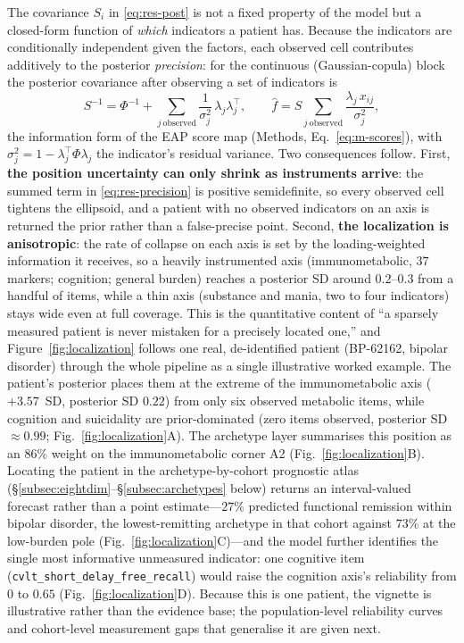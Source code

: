 The covariance $S_i$ in \eqref{eq:res-post} is not a fixed property of the model but a
closed-form function of \emph{which} indicators a patient has. Because the indicators are
conditionally independent given the factors, each observed cell contributes additively to the
posterior \emph{precision}: for the continuous (Gaussian-copula) block the posterior covariance
after observing a set of indicators is
\begin{equation}
  S^{-1}=\Phi^{-1}+\sum_{j\ \text{observed}}\frac{1}{\sigma_j^{2}}\,\lambda_j\lambda_j^{\top},
  \qquad
  \hat f=S\!\!\sum_{j\ \text{observed}}\frac{\lambda_j\,x_{ij}}{\sigma_j^{2}},
  \label{eq:res-precision}
\end{equation}
the information form of the EAP score map (Methods, Eq.~\ref{eq:m-scores}), with
$\sigma_j^{2}=1-\lambda_j^{\top}\Phi\lambda_j$ the indicator's residual variance. Two
consequences follow. First, \textbf{the position uncertainty can only shrink as
instruments arrive}: the summed term in \eqref{eq:res-precision} is positive
semidefinite, so every observed cell tightens the ellipsoid, and a patient with no
observed indicators on an axis is returned the prior rather than a false-precise point.
Second, \textbf{the localization is anisotropic}: the rate of collapse on each axis is
set by the loading-weighted information it receives, so a heavily instrumented axis
(immunometabolic, $37$ markers; cognition; general burden) reaches a posterior SD
around $0.2$--$0.3$ from a handful of items, while a thin axis (substance and mania,
two to four indicators) stays wide even at full coverage. This is the quantitative
content of ``a sparsely measured patient is never mistaken for a precisely located
one,'' and Figure~\ref{fig:localization} follows one real, de-identified patient
(BP-62162, bipolar disorder) through the whole pipeline as a single illustrative worked
example. The patient's posterior places them at the extreme of the immunometabolic axis
($+3.57$~SD, posterior SD $0.22$) from only six observed metabolic items, while
cognition and suicidality are prior-dominated (zero items observed, posterior SD
$\approx0.99$; Fig.~\ref{fig:localization}A). The archetype layer summarises this
position as an $86\%$ weight on the immunometabolic corner A2 (Fig.~\ref{fig:localization}B).
Locating the patient in the archetype-by-cohort prognostic atlas
(\S\ref{subsec:eightdim}--\S\ref{subsec:archetypes} below) returns an interval-valued
forecast rather than a point estimate---$27\%$ predicted functional remission within
bipolar disorder, the lowest-remitting archetype in that cohort against $73\%$ at the
low-burden pole (Fig.~\ref{fig:localization}C)---and the model further identifies the
single most informative unmeasured indicator: one cognitive item
(\texttt{cvlt\_short\_delay\_free\_recall}) would raise the cognition axis's reliability
from $0$ to $0.65$ (Fig.~\ref{fig:localization}D). Because this is one patient, the
vignette is illustrative rather than the evidence base; the population-level reliability
curves and cohort-level measurement gaps that generalise it are given next.

